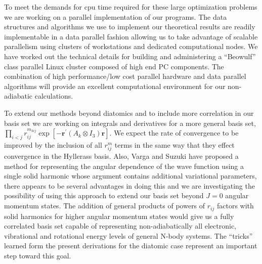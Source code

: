 \documentclass[12pt,doublespace]{article}
\begin{document}
To meet the demands for cpu time required for these large optimization
problems we are working on a parallel implementation of our programs. The
data structures and algorithms we use to implement our theoretical results
are readily implementable in a data parallel fashion allowing us to take
advantage of scalable parallelism using clusters of workstations and
dedicated computational nodes. We have worked out the technical details for
building and administering a ``Beowulf''\cite{beowulfwww} class parallel
Linux cluster composed of high end PC components. The combination of  high
performance/low cost parallel hardware and data parallel algorithms will
provide an excellent computational environment for our non-adiabatic
calculations.

To extend our methods beyond diatomics and to include more correlation in
our basis set we are working on integrals and derivatives for a more general
basis set, $\prod_{i<j}r_{ij}^{m_{kij}}\exp \left[ -\mathbf{r}^{\prime
}(A_{k}\otimes I_{3})\mathbf{r}\right] .$  We expect the rate of convergence
to be improved by the inclusion of all  $r_{ij}^{m}$ terms in the same way
that they effect convergence in the Hyllerass basis. Also, Varga and Suzuki
\cite{Varga95} have proposed a method for representing the angular
dependence of the wave function using a single solid harmonic whose argument
contains additional variational parameters, there appears to be several
advantages in doing this and we are investigating the possibility of using
this approach to extend our basis set beyond $J=0$ angular momentum states.
The addition of general products of powers of $r_{ij}$ factors with solid
harmonics for higher angular momentum states would give us a fully
correlated basis set capable of representing non-adiabatically all
electronic, vibrational and rotational energy levels of general N-body
systems. The ``tricks'' learned form the present derivations for the
diatomic case represent an important step toward this goal. 
\end{document}
